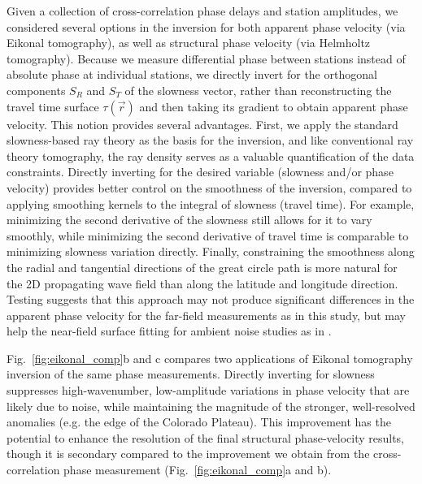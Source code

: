 Given a collection of cross-correlation phase delays and station amplitudes, we considered several options in the inversion for both apparent phase velocity (via Eikonal tomography), as well as structural phase velocity (via Helmholtz tomography).  
Because we measure differential phase between stations instead of absolute phase at individual stations, we directly invert for the orthogonal components $S_R$ and $S_T$ of the slowness vector, rather than reconstructing the travel time surface $\tau(\vec r)$ and then taking its gradient to obtain apparent phase velocity. This notion provides several advantages. First, we apply the standard slowness-based ray theory as the basis for the inversion, and like conventional ray theory tomography, the ray density serves as a valuable quantification of the data constraints. Directly inverting for the desired variable (slowness and/or phase velocity) provides better control on the smoothness of the inversion, compared to applying smoothing kernels to the integral of slowness (travel time).  For example, minimizing the second derivative of the slowness still allows for it to vary smoothly, while minimizing the second derivative of travel time is comparable to minimizing slowness variation directly. Finally, constraining the smoothness along the radial and tangential directions of the great circle path is more natural for the 2D propagating wave field than along the latitude and longitude direction. Testing suggests that this approach may not produce significant differences in the apparent phase velocity for the far-field measurements as in this study, but may help the near-field surface fitting for ambient noise studies as in \citet{Lin:2009fx}.

Fig.~\ref{fig:eikonal_comp}b and c compares two applications of Eikonal tomography inversion of the same phase measurements. Directly inverting for slowness suppresses high-wavenumber, low-amplitude variations in phase velocity that are likely due to noise, while maintaining the magnitude of the stronger, well-resolved anomalies (e.g. the edge of the Colorado Plateau). This improvement has the potential to enhance the resolution of the final structural phase-velocity results, though it is secondary compared to the improvement we obtain from the cross-correlation phase measurement (Fig.~\ref{fig:eikonal_comp}a and b). 

